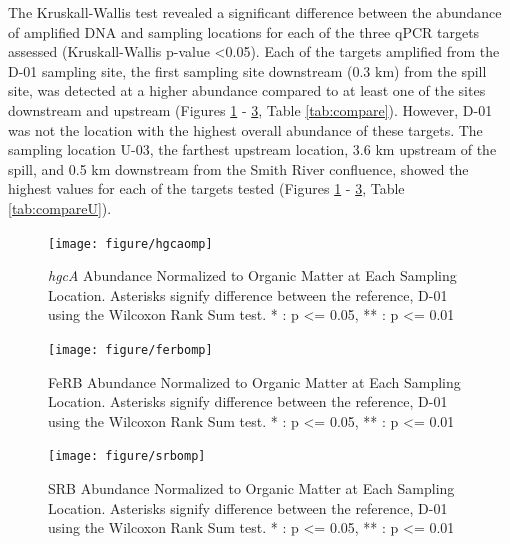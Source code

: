 \documentclass[ms, hidelinks]{uncgdissertationexp}
\theoremstyle{plain}
\theoremstyle{definition}
\theoremstyle{remark}
\begin{document}
The Kruskall-Wallis test revealed a significant difference between the abundance of amplified DNA and sampling locations for each of the three qPCR targets assessed (Kruskall-Wallis p-value \textless0.05). Each of the targets amplified from the D-01 sampling site, the first sampling site downstream (0.3 km) from the spill site, was detected at a higher abundance compared to at least one of the sites downstream and upstream (Figures \ref{fig:hgcaomp} - \ref{fig:srbomp}, Table \ref{tab:compare}). However, D-01 was not the location with the highest overall abundance of these targets. The sampling location U-03, the farthest upstream location, 3.6 km upstream of the spill, and 0.5 km downstream from the Smith River confluence, showed the highest values for each of the targets tested (Figures \ref{fig:hgcaomp} - \ref{fig:srbomp}, Table \ref{tab:compareU}).
\begin{figure}[h]
  \texttt{[image: figure/hgcaomp]}
   \caption[\textit{hgcA} Abundance Normalized to Organic Matter at Each Sampling Location.]{\textit{hgcA} Abundance Normalized to Organic Matter at Each Sampling Location. Asterisks signify difference between the reference, D-01 using the Wilcoxon Rank Sum test. * : p <= 0.05, ** : p <= 0.01}\label{fig:hgcaomp}
\end{figure}
\clearpage
\begin{figure}[h]
  \texttt{[image: figure/ferbomp]}
   \caption[FeRB Abundance Normalized to Organic Matter at Each Sampling Location.]{FeRB Abundance Normalized to Organic Matter at Each Sampling Location. Asterisks signify difference between the reference, D-01 using the Wilcoxon Rank Sum test. * : p <= 0.05, ** : p <= 0.01}\label{fig:ferbomp}
\end{figure}
\clearpage
\begin{figure}[h]
  \texttt{[image: figure/srbomp]}
   \caption[SRB Abundance Normalized to Organic Matter at Each Sampling Location.]{SRB Abundance Normalized to Organic Matter at Each Sampling Location. Asterisks signify difference between the reference, D-01 using the Wilcoxon Rank Sum test. * : p <= 0.05, ** : p <= 0.01}\label{fig:srbomp}
\end{figure}
\clearpage
\end{document}
